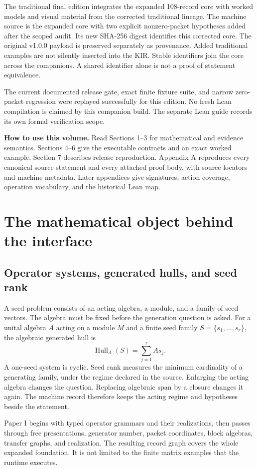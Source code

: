\documentclass[a4paper,11pt]{article}
\newcommand{\Hull}{\operatorname{Hull}}\newcommand{\srank}{\operatorname{srank}}\newcommand{\psrank}{\operatorname{psrank}}\newcommand{\End}{\operatorname{End}}\newcommand{\Hom}{\operatorname{Hom}}\newcommand{\im}{\operatorname{im}}\newcommand{\Ker}{\operatorname{Ker}}\newcommand{\Jac}{\operatorname{Jac}}\newcommand{\Irr}{\operatorname{Irr}}\newcommand{\Span}{\operatorname{span}}\newcommand{\alg}{\operatorname{alg}}\newcommand{\Reach}{\operatorname{Reach}}\newcommand{\Supp}{\operatorname{Supp}}\newcommand{\id}{\mathrm{id}}\newcommand{\cl}[1]{\overline{#1}}
\begin{document}
The traditional final edition integrates the expanded 108-record core with worked models and visual material from the corrected traditional lineage. The machine source is the expanded core with two explicit nonzero-packet hypotheses added after the scoped audit. Its new SHA-256 digest identifies this corrected core. The original v1.0.0 payload is preserved separately as provenance. Added traditional examples are not silently inserted into the KIR. Stable identifiers join the core across the companions. A shared identifier alone is not a proof of statement equivalence.

The current documented release gate, exact finite fixture suite, and narrow zero-packet regression were replayed successfully for this edition. No fresh Lean compilation is claimed by this companion build. The separate Lean guide records its own formal verification scope.

\textbf{How to use this volume.} Read Sections 1--3 for mathematical and evidence semantics. Sections 4--6 give the executable contracts and an exact worked example. Section 7 describes release reproduction. Appendix A reproduces every canonical source statement and every attached proof body, with source locators and machine metadata. Later appendices give signatures, action coverage, operation vocabulary, and the historical Lean map.
\clearpage\tableofcontents\clearpage
\section{The mathematical object behind the interface}
\subsection{Operator systems, generated hulls, and seed rank}
A seed problem consists of an acting algebra, a module, and a family of seed vectors. The algebra must be fixed before the generation question is asked. For a unital algebra $A$ acting on a module $M$ and a finite seed family $S=\{s_1,\ldots,s_r\}$, the algebraic generated hull is
\[
\Hull_A(S)=\sum_{j=1}^{r}As_j.
\]
A one-seed system is cyclic. Seed rank measures the minimum cardinality of a generating family, under the regime declared in the source. Enlarging the acting algebra changes the question. Replacing algebraic span by a closure changes it again. The machine record therefore keeps the acting regime and hypotheses beside the statement.

Paper I begins with typed operator grammars and their realizations, then passes through free presentations, generator number, packet coordinates, block algebras, transfer graphs, and realization. The resulting record graph covers the whole expanded foundation. It is not limited to the finite matrix examples that the runtime executes.
\end{document}

